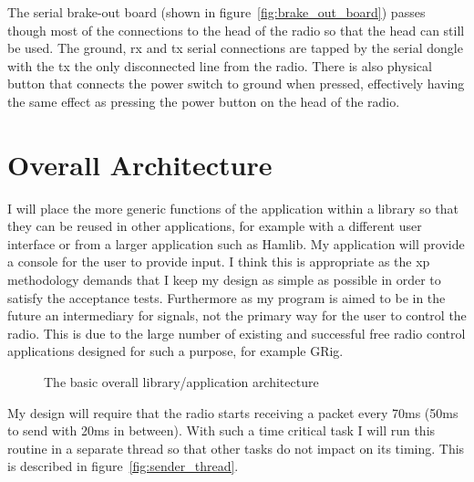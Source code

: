 The serial brake-out board (shown in figure~\ref{fig:brake_out_board}) passes though most of the connections to the head of the radio so that the head can still be used. The ground, \gls{rx} and \gls{tx} serial connections are tapped by the serial dongle with the \gls{tx} the only disconnected line from the radio. There is also physical button that connects the power switch to ground when pressed, effectively having the same effect as pressing the power button on the head of the radio.

\section{Overall Architecture}
I will place the more generic functions of the application within a library so that they can be reused in other applications, for example with a different user interface or from a larger application such as Hamlib\cite{hamlib}. My application will provide a console for the user to provide input. I think this is appropriate as the \gls{xp} methodology demands that I keep my design as simple as possible in order to satisfy the acceptance tests. Furthermore as my program is aimed to be in the future an intermediary for signals, not the primary way for the user to control the radio. This is due to the large number of existing and successful free radio control applications designed for such a purpose, for example GRig\cite{grig}. 

\begin{figure}[H]
\centering
    \caption[basic architecture]{The basic overall library/application architecture}
\end{figure}

My design will require that the radio starts receiving a packet every 70ms (50ms to send with 20ms in between). With such a time critical task I will run this routine in a separate thread so that other tasks do not impact on its timing. This is described in figure~\ref{fig:sender_thread}. 

